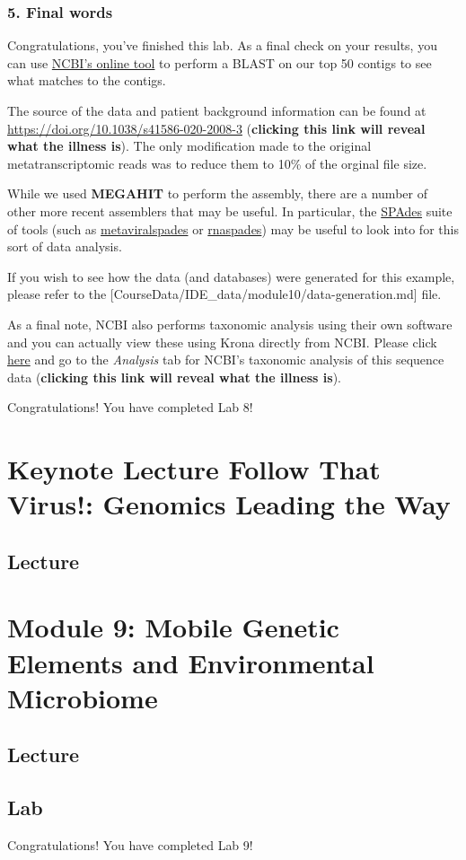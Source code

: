 \documentclass[
]{book}
\begin{document}
\subsection{5. Final words}\label{final-words}

Congratulations, you've finished this lab. As a final check on your results, you can use \href{https://blast.ncbi.nlm.nih.gov/Blast.cgi}{NCBI's online tool} to perform a BLAST on our top 50 contigs to see what matches to the contigs.

The source of the data and patient background information can be found at \url{https://doi.org/10.1038/s41586-020-2008-3} (\textbf{clicking this link will reveal what the illness is}). The only modification made to the original metatranscriptomic reads was to reduce them to 10\% of the orginal file size.

While we used \textbf{MEGAHIT} to perform the assembly, there are a number of other more recent assemblers that may be useful. In particular, the \href{https://cab.spbu.ru/software/spades/}{SPAdes} suite of tools (such as \href{https://doi.org/10.1093/bioinformatics/btaa490}{metaviralspades} or \href{https://doi.org/10.1093/gigascience/giz100}{rnaspades}) may be useful to look into for this sort of data analysis.

If you wish to see how the data (and databases) were generated for this example, please refer to the {[}CourseData/IDE\_data/module10/data-generation.md{]} file.

As a final note, NCBI also performs taxonomic analysis using their own software and you can actually view these using Krona directly from NCBI. Please click \href{https://trace.ncbi.nlm.nih.gov/Traces/sra/?run=SRR10971381}{here} and go to the \emph{Analysis} tab for NCBI's taxonomic analysis of this sequence data (\textbf{clicking this link will reveal what the illness is}).

Congratulations! You have completed Lab 8!

\chapter{Keynote Lecture \textbar{} Follow That Virus!: Genomics Leading the Way}\label{keynote-lecture-follow-that-virus-genomics-leading-the-way}

\section{Lecture}\label{lecture-8}

\chapter{Module 9: Mobile Genetic Elements and Environmental Microbiome}\label{module-9-mobile-genetic-elements-and-environmental-microbiome}

\section{Lecture}\label{lecture-9}

\section{Lab}\label{lab-5}

Congratulations! You have completed Lab 9!


\end{document}
